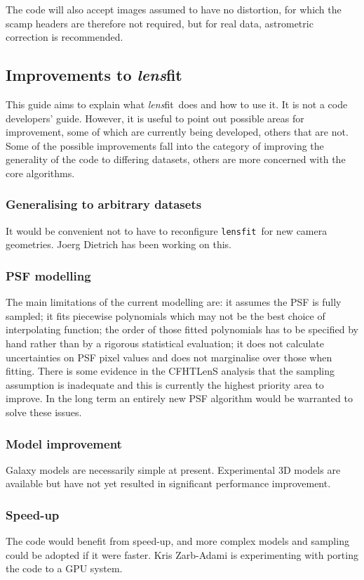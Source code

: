 \documentclass{article}
\def\lensfit{{\tt lensfit}\ }
\def\lensfitsuite{{\em lens}fit\ }
\begin{document}
The code will also accept images assumed to have no distortion, for which the scamp headers are therefore 
not required, but for real data, astrometric correction is recommended. 

\subsection{Improvements to \lensfitsuite }
This guide aims to explain what \lensfitsuite does and how to use it.  It is not a code developers' guide.
However, it is useful to point out possible areas for improvement, some of which are currently being
developed, others that are not.  Some of the possible improvements fall into the category of improving
the generality of the code to differing datasets, others are more concerned with the core algorithms.

\subsubsection{Generalising to arbitrary datasets}
It would be convenient not to have to reconfigure \lensfit for new camera geometries.  Joerg Dietrich
has been working on this.

\subsubsection{PSF modelling}
The main limitations of the current modelling are: it assumes the PSF is fully sampled; it fits piecewise
polynomials which may not be the best choice of interpolating function; the order of those fitted polynomials
has to be specified by hand rather than by a rigorous statistical evaluation; it does not calculate uncertainties
on PSF pixel values and does not marginalise over those when fitting.  There is some evidence in the CFHTLenS
analysis that the sampling assumption is inadequate and this is currently the highest priority area to improve.
In the long term an entirely new PSF algorithm would be warranted to solve these issues.

\subsubsection{Model improvement}
Galaxy models are necessarily simple at present.  Experimental 3D models are available but have not yet
resulted in significant performance improvement.

\subsubsection{Speed-up}
The code would benefit from speed-up, and more complex models and sampling could be adopted if it were
faster. Kris Zarb-Adami is experimenting with porting the code to a GPU system.
\end{document}
